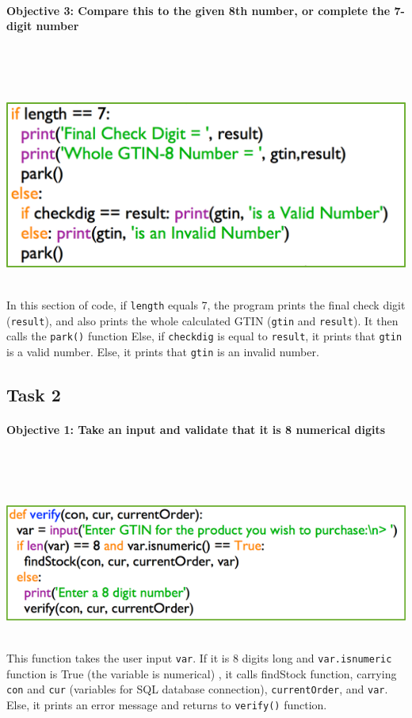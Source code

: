 \documentclass[a4paper]{article}
\begin{document}
\paragraph{Objective 3: Compare this to the given 8th number, or complete the 7-digit number} ~\par ~\par
\noindent\includegraphics{task1_compare1.png} ~\par
In this section of code, if \verb?length? equals 7, the program prints the final check digit (\verb?result?), and also prints the whole calculated GTIN (\verb?gtin? and \verb?result?). It then calls the \verb|park()| function
Else, if \verb?checkdig? is equal to \verb?result?, it prints that \verb?gtin? is a valid number. Else, it prints that \verb?gtin? is an invalid number.

\newpage
\subsection{Task 2}
\paragraph{Objective 1: Take an input and validate that it is 8 numerical digits} ~\par ~\par
\noindent\includegraphics{task2_obj1_1.png} ~\par
This function takes the user input \verb?var?. If it is 8 digits long and \verb|var.isnumeric| function is True (the variable is numerical) , it calls findStock function, carrying \verb?con? and \verb?cur? (variables for SQL database connection), \verb?currentOrder?, and \verb?var?. Else, it prints an error message and returns to \verb|verify()| function.
\end{document}
